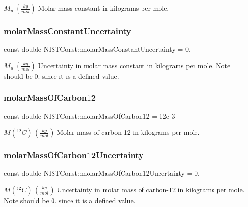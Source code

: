 $M_u \ (\frac{kg}{mol})$ Molar mass constant in kilograms per mole. \mbox{\label{group___molar_mass_constant_ga7aea373fd7ef8740aa22140aab339ce8}} 
\subsubsection{\texorpdfstring{molar\+Mass\+Constant\+Uncertainty}{molarMassConstantUncertainty}}
{\footnotesize\ttfamily const double N\+I\+S\+T\+Const\+::molar\+Mass\+Constant\+Uncertainty = 0.}

$M_u \ (\frac{kg}{mol})$ Uncertainty in molar mass constant in kilograms per mole. Note should be 0. since it is a defined value. \mbox{\label{group___molar_mass_constant_gab1aae3b38f21cb9a15fdc8209d3cf1f0}} 
\subsubsection{\texorpdfstring{molar\+Mass\+Of\+Carbon12}{molarMassOfCarbon12}}
{\footnotesize\ttfamily const double N\+I\+S\+T\+Const\+::molar\+Mass\+Of\+Carbon12 = 12e-\/3}

$M({^12C}) \ (\frac{kg}{mol})$ Molar mass of carbon-\/12 in kilograms per mole. \mbox{\label{group___molar_mass_constant_gae2fea17985c3e8877e1baab9f9382676}} 
\subsubsection{\texorpdfstring{molar\+Mass\+Of\+Carbon12\+Uncertainty}{molarMassOfCarbon12Uncertainty}}
{\footnotesize\ttfamily const double N\+I\+S\+T\+Const\+::molar\+Mass\+Of\+Carbon12\+Uncertainty = 0.}

$M({^12C}) \ (\frac{kg}{mol})$ Uncertainty in molar mass of carbon-\/12 in kilograms per mole. Note should be 0. since it is a defined value. 